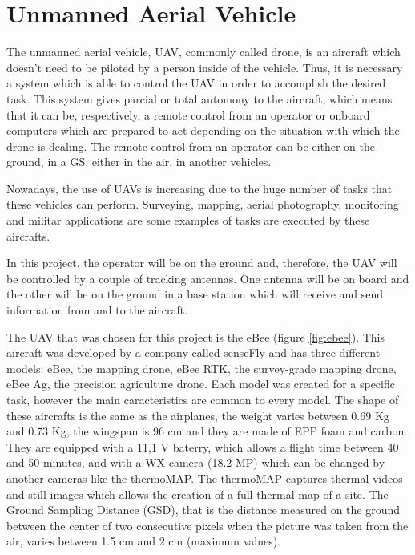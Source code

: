 \section{Unmanned Aerial Vehicle}\label{sec:drone}

The unmanned aerial vehicle, UAV, commonly called drone, is an aircraft which doesn't need to be piloted by a person inside of the vehicle. Thus, it is necessary a system which is able to control the UAV in order to accomplish the desired task. This system gives parcial or total automony to the aircraft, which means that it can be, respectively, a remote control from an operator or onboard computers which are prepared to act depending on the situation with which the drone is dealing. The remote control from an operator can be either on the ground, in a GS, either in the air, in another vehicles.

Nowadays, the use of UAVs is increasing due to the huge number of tasks that these vehicles can perform. Surveying, mapping, aerial photography, monitoring and militar applications are some examples of tasks are executed by these aircrafts.  

In this project, the operator will be on the ground and, therefore, the UAV will be controlled by a couple of tracking antennas. One antenna will be on board and the other will be on the ground in a base station which will receive and send information from and to the aircraft. 

The UAV that was chosen for this project is the eBee (figure \ref{fig:ebee}). This aircraft was developed by a company called senseFly and has three different models: eBee, the mapping drone, eBee RTK, the survey-grade mapping drone, eBee Ag, the precision agriculture drone. Each model was created for a specific task, however the main caracteristics are common to every model. The shape of these aircrafts is the same as the airplanes, the weight varies between 0.69 Kg and 0.73 Kg, the wingspan is 96 cm and they are made of EPP foam and carbon. They are equipped with a 11,1 V baterry, which allows a flight time between 40 and 50 minutes, and with a WX camera (18.2 MP) which can be changed by another cameras like the thermoMAP. The thermoMAP captures thermal videos and still images which allows the creation of a full thermal map of a site. The Ground Sampling Distance (GSD), that is the distance measured on the ground between the center of two consecutive pixels when the picture was taken from the air, varies between 1.5 cm and 2 cm (maximum values). 
 
